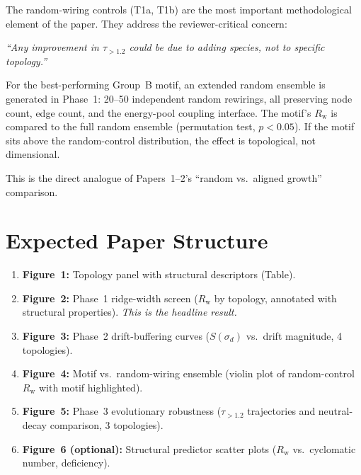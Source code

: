 \documentclass[aps,prl,twocolumn,superscriptaddress,floatfix]{revtex4-2}
\newcommand{\tauexp}{\tau_{>1.2}}
\newcommand{\Rw}{R_{\mathrm{w}}}
\begin{document}
The random-wiring controls (T1a, T1b) are the most important
methodological element of the paper.  They address the
reviewer-critical concern:

\emph{``Any improvement in $\tauexp$ could be due to adding
species, not to specific topology.''}

For the best-performing Group~B motif, an extended random
ensemble is generated in Phase~1: 20--50 independent random
rewirings, all preserving node count, edge count, and the
energy-pool coupling interface.  The motif's $\Rw$ is compared
to the full random ensemble (permutation test, $p < 0.05$).
If the motif sits above the random-control distribution, the
effect is topological, not dimensional.

This is the direct analogue of Papers~1--2's ``random vs.\
aligned growth'' comparison.

\section{Expected Paper Structure}

\begin{enumerate}
  \item \textbf{Figure~1:}  Topology panel with structural
    descriptors (Table).

  \item \textbf{Figure~2:}  Phase~1 ridge-width screen
    ($\Rw$ by topology, annotated with structural properties).
    \emph{This is the headline result.}

  \item \textbf{Figure~3:}  Phase~2 drift-buffering curves
    ($S(\sigma_d)$ vs.\ drift magnitude, 4 topologies).

  \item \textbf{Figure~4:}  Motif vs.\ random-wiring ensemble
    (violin plot of random-control $\Rw$ with motif highlighted).

  \item \textbf{Figure~5:}  Phase~3 evolutionary robustness
    ($\tauexp$ trajectories and neutral-decay comparison,
    3 topologies).

  \item \textbf{Figure~6 (optional):}  Structural predictor
    scatter plots ($\Rw$ vs.\ cyclomatic number, deficiency).
\end{enumerate}
\end{document}
